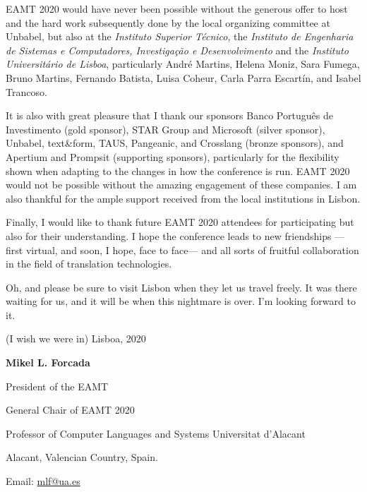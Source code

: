 \documentclass[a4paper,11pt,twoside]{book}
\begin{document}
EAMT 2020 would have never been possible without the generous offer to host and the
hard work subsequently done by the local organizing committee at Unbabel, but also at the \emph{Instituto Superior Técnico}, the \emph{Instituto de Engenharia de Sistemas e Computadores, Investigação e Desenvolvimento} and the \emph{Instituto Universitário de Lisboa}, particularly André Martins, Helena Moniz, Sara Fumega, Bruno Martins, Fernando Batista, Luisa Coheur, Carla Parra Escartín, and Isabel Trancoso.

It is also with great pleasure that I thank our sponsors Banco Português de Investimento (gold sponsor), STAR Group and Microsoft (silver sponsor), Unbabel, text\&form, TAUS, Pangeanic, and Crosslang (bronze sponsors), and Apertium and Prompsit (supporting sponsors), particularly for the flexibility shown when adapting to the changes in how the conference is run. EAMT 2020 would not be possible without the amazing engagement of these companies. I am also thankful for the ample support received from the local institutions in Lisbon. 

Finally, I would like to thank future EAMT 2020 attendees for participating but also for their understanding. I hope
the conference leads to new friendships ---first virtual, and soon, I hope, face to face--- and all sorts of fruitful collaboration in the field of translation technologies. 

Oh, and please be sure to visit Lisbon when they let us travel freely. It was there waiting for us, and it will be when this nightmare is over. I'm looking forward to it.

\vspace{1cm}

\noindent (I wish we were in) Lisboa, 2020

\vspace{1cm}

\noindent \textbf{Mikel L. Forcada}

\noindent President of the EAMT

\noindent General Chair of EAMT 2020

\noindent Professor of Computer Languages and Systems
\noindent Universitat d'Alacant

\noindent Alacant, Valencian Country, Spain.

\noindent Email: \url{mlf@ua.es}

\end{document}
